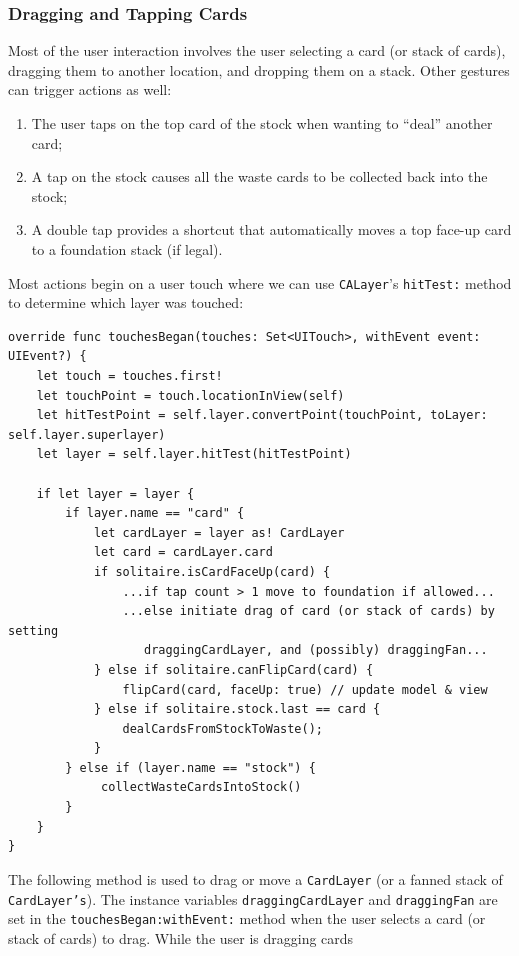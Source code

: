 \documentclass[11pt]{article}
\begin{document}
\subsubsection{Dragging and Tapping Cards}

Most of the user interaction involves the user selecting a card (or stack
of cards), dragging them to another location, and dropping them on
a stack. Other gestures can trigger actions as well:
\begin{enumerate}
\item The user taps on the top card of the stock when wanting to
  ``deal'' another card;
\item A tap on the stock causes all the waste cards to be collected
  back into the stock;
\item A double tap provides a shortcut that automatically moves a
  top face-up card to a foundation stack (if legal).
\end{enumerate}
Most actions begin on a user touch where we can use 
{\tt CALayer}'s {\tt hitTest:} method to determine which layer was touched:
\begin{verbatim}
override func touchesBegan(touches: Set<UITouch>, withEvent event: UIEvent?) {
    let touch = touches.first!
    let touchPoint = touch.locationInView(self)
    let hitTestPoint = self.layer.convertPoint(touchPoint, toLayer: self.layer.superlayer)
    let layer = self.layer.hitTest(hitTestPoint)
        
    if let layer = layer {
        if layer.name == "card" {
            let cardLayer = layer as! CardLayer
            let card = cardLayer.card
            if solitaire.isCardFaceUp(card) {
                ...if tap count > 1 move to foundation if allowed...
                ...else initiate drag of card (or stack of cards) by setting
                   draggingCardLayer, and (possibly) draggingFan...
            } else if solitaire.canFlipCard(card) {
                flipCard(card, faceUp: true) // update model & view
            } else if solitaire.stock.last == card {
                dealCardsFromStockToWaste();
            } 
        } else if (layer.name == "stock") {
             collectWasteCardsIntoStock()
        }
    }
}
\end{verbatim}
The following method is used to drag or move a {\tt CardLayer} (or a fanned stack of
{\tt CardLayer's}). The instance variables
{\tt draggingCardLayer} and {\tt draggingFan} are set
in the {\tt touchesBegan:withEvent:} method when the user selects
a card (or stack of cards) to drag.
While the user is dragging cards 
\end{document}
